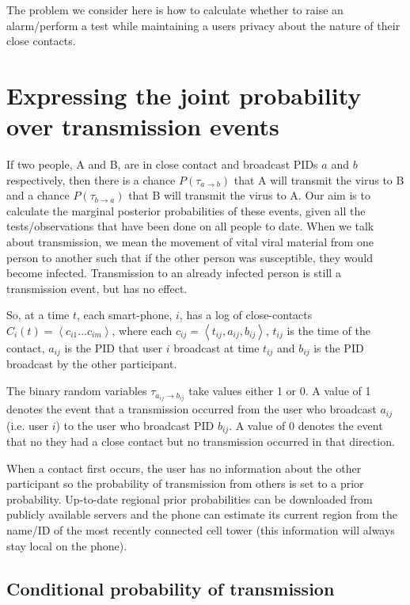 \documentclass{article}
\begin{document}
The problem we consider here is how to calculate whether to raise an alarm/perform a test while maintaining a users privacy about the nature of their close contacts.


\section{Expressing the joint probability over transmission events}

If two people, A and B, are in close contact and broadcast PIDs $a$ and $b$ respectively, then there is a chance $P(\tau_{a \rightarrow b})$ that A will transmit the virus to B and a chance $P(\tau_{b \rightarrow a})$ that B will transmit the virus to A. Our aim is to calculate the marginal posterior probabilities of these events, given all the tests/observations that have been done on all people to date. When we talk about transmission, we mean the movement of vital viral material from one person to another such that if the other person was susceptible, they would become infected. Transmission to an already infected person is still a transmission event, but has no effect.

So, at a time $t$, each smart-phone, $i$, has a log of close-contacts $C_i(t) = \left<c_{i1}...c_{im}\right>$, where each $c_{ij} = \left<t_{ij}, a_{ij},b_{ij}\right>$, $t_{ij}$ is the time of the contact, $a_{ij}$ is the PID that user $i$ broadcast at time $t_{ij}$ and $b_{ij}$ is the PID broadcast by the other participant.

The binary random variables $\tau_{a_{ij}\rightarrow b_{ij}}$ take values either 1 or 0. A value of 1 denotes the event that a transmission occurred from the user who broadcast $a_{ij}$ (i.e. user $i$) to the user who broadcast PID $b_{ij}$. A value of 0 denotes the event that no they had a close contact but no transmission occurred in that direction.

When a contact first occurs, the user has no information about the other participant so the probability of transmission from others is set to a prior probability. Up-to-date regional prior probabilities can be downloaded from publicly available servers and the phone can estimate its current region from the name/ID of the most recently connected cell tower (this information will always stay local on the phone).

\subsection{Conditional probability of transmission}
\end{document}
